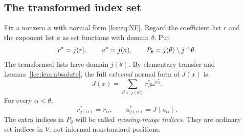 \documentclass[11pt,letterpaper]{article}
\numberwithin{equation}{section}
\theoremstyle{definition}
\theoremstyle{remark}
\newcommand{\imset}[2]{#1\mathbin{``}#2}
\newcommand{\leref}[1]{Lemma~\ref{#1}}
\begin{document}
\subsection{The transformed index set}
Fix a nonzero $x$ with normal form \eqref{lce:eq:NF}. Regard the coefficient
list $r$ and the exponent list $a$ as set functions with domain $\theta$.
Put
\[
 r^*=j(r),\qquad a^*=j(a),\qquad
 P_\theta=j(\theta)\setminus\imset j\theta.
\]
The transformed lists have domain $j(\theta)$. By elementary transfer and
\leref{lce:lem:absolute}, the full \emph{external} normal form of $J(x)$ is
\begin{equation}\label{lce:eq:Jnormal}
 J(x)=\sum_{\beta<j(\theta)}r^*_\beta\omega^{a^*_\beta}.
\end{equation}
For every $\alpha<\theta$,
\begin{equation}\label{lce:eq:oldindices}
 r^*_{j(\alpha)}=r_\alpha,\qquad
 a^*_{j(\alpha)}=J(a_\alpha).
\end{equation}
The extra indices in $P_\theta$ will be called \emph{missing-image indices}.
They are ordinary set indices in $V$, not informal nonstandard positions.
\end{document}
